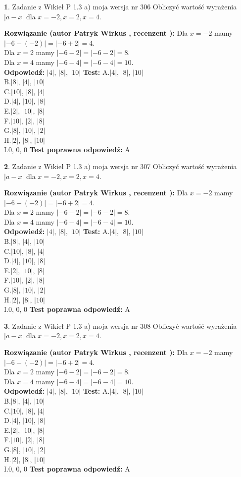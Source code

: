 \documentclass[12pt, a4paper]{article}
\theoremstyle{definition} %
\newtheorem{zad}{}
\newcommand{\zadStart}[1]{\begin{zad}#1\newline}
\newcommand{\zadStop}{\end{zad}}
\newcommand{\rozwStart}[2]{\noindent \textbf{Rozwiązanie (autor #1 , recenzent #2): }\newline}
\newcommand{\rozwStop}{\newline}
\newcommand{\odpStart}{\noindent \textbf{Odpowiedź:}\newline}
\newcommand{\odpStop}{\newline}
\newcommand{\testStart}{\noindent \textbf{Test:}\newline}
\newcommand{\testStop}{\newline}
\newcommand{\kluczStart}{\noindent \textbf{Test poprawna odpowiedź:}\newline}
\newcommand{\kluczStop}{\newline}
\begin{document}
\zadStart{Zadanie z Wikieł P 1.3 a) moja wersja nr 306}
Obliczyć wartość wyrażenia $|a - x|$ dla $x=-2,x=2,x=4$.
\zadStop
\rozwStart{Patryk Wirkus}{}
Dla $x = -2$ mamy $|-6 - (-2)| = |-6 + 2| = 4$.\\
Dla $x = 2$ mamy $|-6 - 2| = |-6 - 2| = 8$.\\
Dla $x = 4$ mamy $|-6 - 4| = |-6 - 4| = 10$.\\
\rozwStop
\odpStart
$|4|$, $|8|$, $|10|$
\odpStop
\testStart
A.$|4|$, $|8|$, $|10|$\\
B.$|8|$, $|4|$, $|10|$\\
C.$|10|$, $|8|$, $|4|$\\
D.$|4|$, $|10|$, $|8|$\\
E.$|2|$, $|10|$, $|8|$\\
F.$|10|$, $|2|$, $|8|$\\
G.$|8|$, $|10|$, $|2|$\\
H.$|2|$, $|8|$, $|10|$\\
I.$0$, $0$, $0$
\testStop
\kluczStart
A
\kluczStop



\zadStart{Zadanie z Wikieł P 1.3 a) moja wersja nr 307}
Obliczyć wartość wyrażenia $|a - x|$ dla $x=-2,x=2,x=4$.
\zadStop
\rozwStart{Patryk Wirkus}{}
Dla $x = -2$ mamy $|-6 - (-2)| = |-6 + 2| = 4$.\\
Dla $x = 2$ mamy $|-6 - 2| = |-6 - 2| = 8$.\\
Dla $x = 4$ mamy $|-6 - 4| = |-6 - 4| = 10$.\\
\rozwStop
\odpStart
$|4|$, $|8|$, $|10|$
\odpStop
\testStart
A.$|4|$, $|8|$, $|10|$\\
B.$|8|$, $|4|$, $|10|$\\
C.$|10|$, $|8|$, $|4|$\\
D.$|4|$, $|10|$, $|8|$\\
E.$|2|$, $|10|$, $|8|$\\
F.$|10|$, $|2|$, $|8|$\\
G.$|8|$, $|10|$, $|2|$\\
H.$|2|$, $|8|$, $|10|$\\
I.$0$, $0$, $0$
\testStop
\kluczStart
A
\kluczStop



\zadStart{Zadanie z Wikieł P 1.3 a) moja wersja nr 308}
Obliczyć wartość wyrażenia $|a - x|$ dla $x=-2,x=2,x=4$.
\zadStop
\rozwStart{Patryk Wirkus}{}
Dla $x = -2$ mamy $|-6 - (-2)| = |-6 + 2| = 4$.\\
Dla $x = 2$ mamy $|-6 - 2| = |-6 - 2| = 8$.\\
Dla $x = 4$ mamy $|-6 - 4| = |-6 - 4| = 10$.\\
\rozwStop
\odpStart
$|4|$, $|8|$, $|10|$
\odpStop
\testStart
A.$|4|$, $|8|$, $|10|$\\
B.$|8|$, $|4|$, $|10|$\\
C.$|10|$, $|8|$, $|4|$\\
D.$|4|$, $|10|$, $|8|$\\
E.$|2|$, $|10|$, $|8|$\\
F.$|10|$, $|2|$, $|8|$\\
G.$|8|$, $|10|$, $|2|$\\
H.$|2|$, $|8|$, $|10|$\\
I.$0$, $0$, $0$
\testStop
\kluczStart
A
\kluczStop
\end{document}

